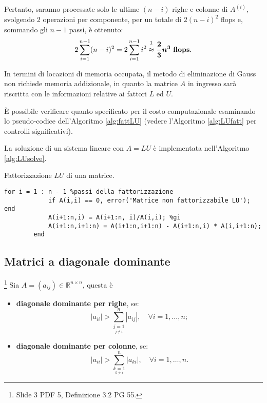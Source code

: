 Pertanto, saranno processate solo le ultime $(n-i)$ righe e colonne di $A^{(i)}$, svolgendo 2 operazioni per componente, per un totale di $2(n-i)^2$ flops e, sommando gli $n-1$ passi, è ottenuto:
\begin{equation}\label{eq:costoFattLU}
    2\sum_{i=1}^{n-1}(n-i)^2=2\sum_{i=1}^{n-1}i^2\overset{\footnotemark}{\approx}\boldsymbol{\frac{2}{3}n^3}\text{ \textbf{flops}.}
\end{equation}

In termini di locazioni di memoria occupata, il metodo di eliminazione di Gauss non richiede memoria addizionale, in quanto la matrice $A$ in ingresso sarà riscritta con le informazioni relative ai fattori $L$ ed $U$.

È possibile verificare quanto specificato per il costo computazionale esaminando lo pseudo-codice dell'Algoritmo \ref{alg:fattLU} (vedere l'Algoritmo \ref{alg:LUfatt} per controlli significativi).

La soluzione di un sistema lineare con $A=LU$ è implementata nell'Algoritmo \ref{alg:LUsolve}.
\begin{algorithm}
\caption{Fattorizzazione $LU$ di una matrice.}
\label{alg:fattLU}
    \begin{lstlisting}[style=Matlab-editor]
        for i = 1 : n - 1 %passi della fattorizzazione
            if A(i,i) == 0, error('Matrice non fattorizzabile LU'); end
            A(i+1:n,i) = A(i+1:n, i)/A(i,i); %gi
            A(i+1:n,i+1:n) = A(i+1:n,i+1:n) - A(i+1:n,i) * A(i,i+1:n);
        end
    \end{lstlisting}
\end{algorithm}

\subsection{Matrici a diagonale dominante}\label{ssec:matrici_diagonale_dominante}
\begin{definition}\label{def:matrice_diagonale_dominante}\footnote{Slide 3 PDF 5, Definizione 3.2 PG 55.}
    Sia $A=(a_{ij})\in\mathbb R^{n\times n}$, questa è
    \begin{itemize}
        \item \textbf{diagonale dominante per righe}, se:
        \begin{equation}\label{eq:matrice_diagonale_dominante_righe}
            |a_{ii}|>\sum_{\underset{j\neq i}{j=1}}^n |a_{ij}|,\quad 
            \forall i=1,\hdots, n;
        \end{equation}
        \item \textbf{diagonale dominante per colonne}, se:
        \begin{equation*}
            |a_{ii}|>\sum_{\underset{k\neq i}{k=1}}^n|a_{ki}|,\quad \forall i=1,\hdots,n.
        \end{equation*}
    \end{itemize}
\end{definition}

